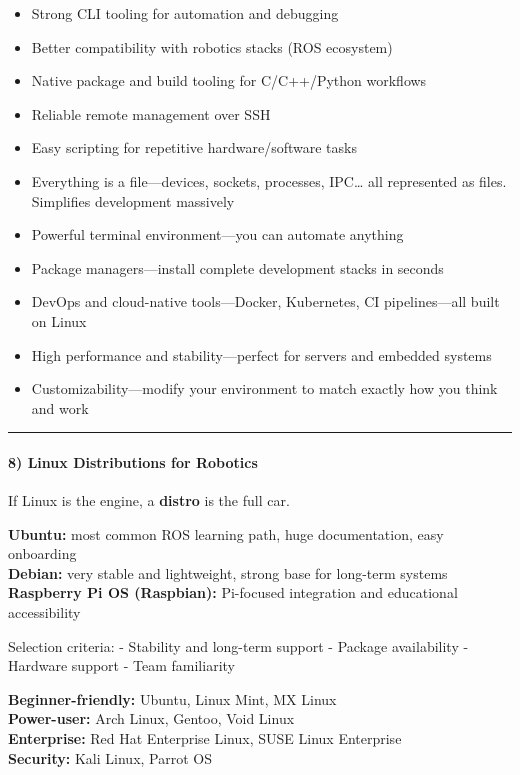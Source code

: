 \documentclass[
  english,
  paper=a4,
  oneside  ,captions=tableheading
]{scrartcl}
\providecommand{\tightlist}{%
  \setlength{\itemsep}{0pt}\setlength{\parskip}{0pt}}
\begin{document}
\begin{itemize}
\tightlist
\item
  Strong CLI tooling for automation and debugging
\item
  Better compatibility with robotics stacks (ROS ecosystem)
\item
  Native package and build tooling for C/C++/Python workflows
\item
  Reliable remote management over SSH
\item
  Easy scripting for repetitive hardware/software tasks
\item
  Everything is a file---devices, sockets, processes, IPC\ldots{} all
  represented as files. Simplifies development massively
\item
  Powerful terminal environment---you can automate anything
\item
  Package managers---install complete development stacks in seconds
\item
  DevOps and cloud-native tools---Docker, Kubernetes, CI pipelines---all
  built on Linux
\item
  High performance and stability---perfect for servers and embedded
  systems
\item
  Customizability---modify your environment to match exactly how you
  think and work
\end{itemize}

\begin{center}\rule{0.5\linewidth}{0.5pt}\end{center}

\paragraph{8) Linux Distributions for
Robotics}\label{linux-distributions-for-robotics}

If Linux is the engine, a \textbf{distro} is the full car.

\textbf{Ubuntu:} most common ROS learning path, huge documentation, easy
onboarding\\
\textbf{Debian:} very stable and lightweight, strong base for long-term
systems\\
\textbf{Raspberry Pi OS (Raspbian):} Pi-focused integration and
educational accessibility

Selection criteria: - Stability and long-term support - Package
availability - Hardware support - Team familiarity

\textbf{Beginner-friendly:} Ubuntu, Linux Mint, MX Linux\\
\textbf{Power-user:} Arch Linux, Gentoo, Void Linux\\
\textbf{Enterprise:} Red Hat Enterprise Linux, SUSE Linux Enterprise\\
\textbf{Security:} Kali Linux, Parrot OS
\end{document}
